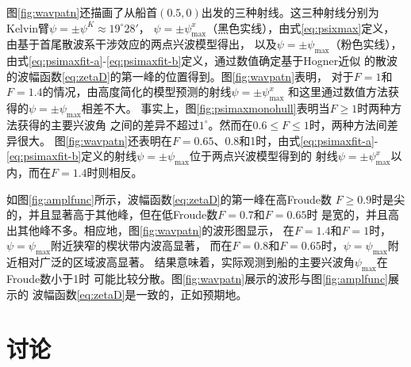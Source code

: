 图\ref{fig:wavpatn}还描画了从船首$(0.5,0)$出发的三种射线。这三种射线分别为
Kelvin臂$\psi=\pm\psi^K\approx19^\circ28'$，
$\psi=\pm\psi^x_{\max}$（黑色实线），由式\eqref{eq:psixmax}定义，
由基于首尾散波系干涉效应的两点兴波模型\supercite{Noblesse2014Why}得出，
以及$\psi=\pm\psi_{\max}$（粉色实线），
由式\eqref{eq:psimaxfit-a}-\eqref{eq:psimaxfit-b}定义，通过数值确定基于Hogner近似
的散波的波幅函数\eqref{eq:zetaD}的第一峰的位置得到。图\ref{fig:wavpatn}表明，
对于$F=1$和$F=1.4$的情况，由高度简化的模型预测的射线$\psi=\pm\psi^x_{\max}$
和这里通过数值方法获得的$\psi=\pm\psi_{\max}$相差不大。
事实上，图\ref{fig:psimaxmonohull}表明当$F\ge1$时两种方法获得的主要兴波角
之间的差异不超过$1^\circ$。然而在$0.6\le F\le1$时，两种方法间差异很大。
图\ref{fig:wavpatn}还表明在$F=0.65$、0.8和1时，由式\eqref{eq:psimaxfit-a}-
\eqref{eq:psimaxfit-b}定义的射线$\psi=\pm\psi_{\max}$位于两点兴波模型得到的
射线$\psi=\pm\psi^x_{\max}$以内，而在$F=1.4$时则相反。

如图\ref{fig:amplfunc}所示，波幅函数\eqref{eq:zetaD}的第一峰在高Froude数
$F\ge0.9$时是尖的，并且显著高于其他峰，但在低Froude数$F=0.7$和$F=0.65$时
是宽的，并且高出其他峰不多。相应地，图\ref{fig:wavpatn}的波形图显示，
在$F=1.4$和$F=1$时，$\psi=\psi_{\max}$附近狭窄的楔状带内波高显著，
而在$F=0.8$和$F=0.65$时，$\psi=\psi_{\max}$附近相对广泛的区域波高显著。
结果意味着，实际观测到船的主要兴波角$\psi_{\max}$在Froude数小于1时
可能比较分散。图\ref{fig:wavpatn}展示的波形与图\ref{fig:amplfunc}展示的
波幅函数\eqref{eq:zetaD}是一致的，正如预期地。

\section{讨论}
\label{sec:discuz}

